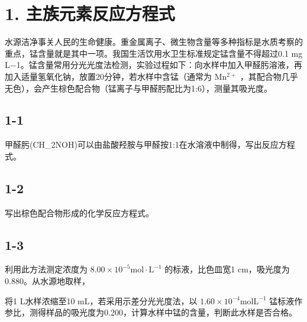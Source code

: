 \section*{1. 主族元素反应方程式}
⽔源洁净事关⼈⺠的⽣命健康。重⾦属离⼦、微⽣物含量等多种指标是⽔质考察的重点，锰含量就是其中⼀项。我国⽣活饮⽤⽔卫⽣标准规定锰含量不得超过0.1 mg L−1。锰含量常⽤分光光度法检测，实验过程如下：向⽔样中加⼊甲醛肟溶液，再加⼊适量氢氧化钠，放置20分钟，若⽔样中含锰（通常为 $\mathrm { M n ^ { 2 + } }$ ，其配合物⼏乎⽆⾊），会产⽣棕⾊配合物（锰离⼦与甲醛肟配⽐为1:6），测量其吸光度。

\subsection*{1-1}
甲醛肟(CH_{2}NOH)可以由盐酸羟胺与甲醛按1:1在⽔溶液中制得，写出反应⽅程式。

\subsection*{1-2}
写出棕⾊配合物形成的化学反应⽅程式。

\subsection*{1-3}
利⽤此⽅法测定浓度为 $8 . 0 0 { \times } 1 0 ^ { - 5 } \mathrm { m o l { \cdot } L ^ { - 1 } }$ 的标液，⽐⾊⽫宽1 cm，吸光度为0.880。从⽔源地取样，

将1 L⽔样浓缩⾄10 mL，若采⽤⽰差分光光度法，以 $1 . 6 0 \times 1 0 ^ { - 4 } \mathrm { m o l } \mathrm { L } ^ { - 1 }$ 锰标液作参⽐，测得样品的吸光度为0.200，计算⽔样中锰的含量，判断此⽔样是否合格。
